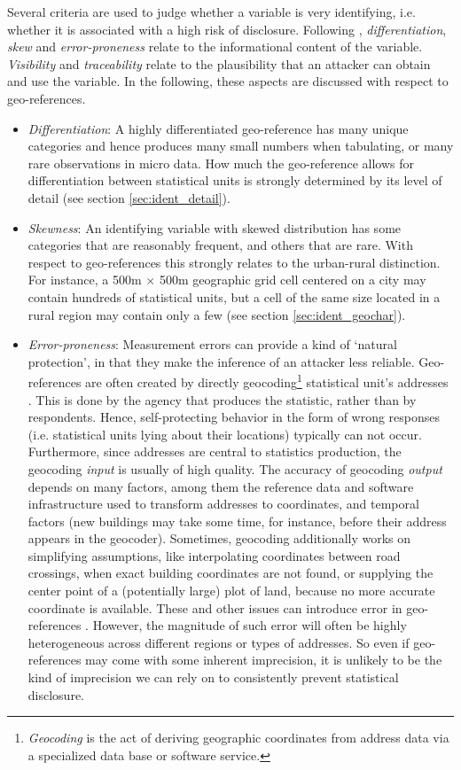 Several criteria are used to judge whether a variable is very identifying, i.e. whether it is associated with a high risk of disclosure. Following \cite{ElliotDale1999}, \emph{differentiation}, \emph{skew} and \emph{error-proneness} relate to the informational content of the variable. \emph{Visibility} and \emph{traceability} \citep[~p.52]{WillenborgDeWaal1996} relate to the plausibility that an attacker can obtain and use the variable. In the following, these aspects are discussed with respect to geo-references.
\begin{itemize}
    \item \emph{Differentiation}: A highly differentiated geo-reference has many unique categories and hence produces many small numbers when tabulating, or many rare observations in micro data. How much the geo-reference allows for differentiation between statistical units is strongly determined by its level of detail (see section \ref{sec:ident_detail}).
    \item \emph{Skewness}: An identifying variable with skewed distribution has some categories that are reasonably frequent, and others that are rare. With respect to geo-references this strongly relates to the urban-rural distinction. For instance, a 500m $\times$ 500m geographic grid cell centered on a city may contain hundreds of statistical units, but a cell of the same size located in a rural region may contain only a few (see section \ref{sec:ident_geochar}).
    \item \emph{Error-proneness}: Measurement errors can provide a kind of `natural protection', in that they make the inference of an attacker less reliable. Geo-references are often created by directly geocoding\footnote{
        \emph{Geocoding} is the act of deriving geographic coordinates from address data via a specialized data base or software service.} 
    statistical unit's addresses \citep{HaldorsonMostrom2019}. This is done by the agency that produces the statistic, rather than by respondents. Hence, self-protecting behavior in the form of wrong responses (i.e. statistical units lying about their locations) typically can not occur. Furthermore, since addresses are central to statistics production, the geocoding \emph{input} is usually of high quality. The accuracy of geocoding \emph{output} depends on many factors, among them the reference data and software infrastructure used to transform addresses to coordinates,  
    and temporal factors (new buildings may take some time, for instance, before their address appears in the geocoder). Sometimes, geocoding additionally works on simplifying assumptions, like interpolating coordinates between road crossings, when exact building coordinates are not found, or supplying the center point of a (potentially large) plot of land, because no more accurate coordinate is available. These and other issues can introduce error in geo-references \citep{OwusuEtAl2017, GrubesicMurray2004}. However, the magnitude of such error will often be highly heterogeneous across different regions or types of addresses. So even if geo-references may come with some inherent imprecision, it is unlikely to be the kind of imprecision we can rely on to consistently prevent statistical disclosure.

\end{itemize}

